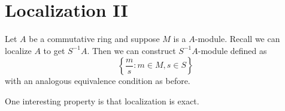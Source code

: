 \section{Localization II}
Let $A$ be a commutative ring and suppose $M$ is a $A$-module. Recall we can localize $A$ to get $S^{-1}A$. Then we can construct $S^{-1}A$-module defined as
\[
    \left\{ \frac{m}{s} : m \in M, s \in S\right\}
\]
with an analogous equivalence condition as before.

One interesting property is that localization is exact.
